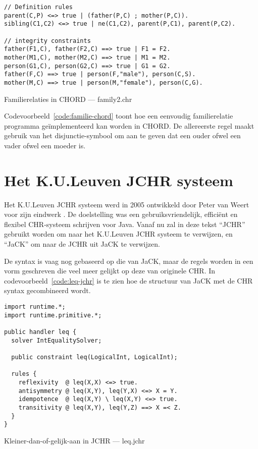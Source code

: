 \begin{exCode}[bhp]
\begin{Verbatim}[frame=single]
// Definition rules
parent(C,P) <=> true | (father(P,C) ; mother(P,C)).
sibling(C1,C2) <=> true | ne(C1,C2), parent(P,C1), parent(P,C2).

// integrity constraints
father(F1,C), father(F2,C) ==> true | F1 = F2.
mother(M1,C), mother(M2,C) ==> true | M1 = M2.
person(G1,C), person(G2,C) ==> true | G1 = G2.
father(F,C) ==> true | person(F,"male"), person(C,S).
mother(M,C) ==> true | person(M,"female"), person(C,G).
\end{Verbatim}
\caption{Familierelaties in CHORD --- family2.chr}
\label{code:familie-chord}
\end{exCode}
Codevoorbeeld~\ref{code:familie-chord} toont hoe een eenvoudig familierelatie programma ge\"implementeerd kan worden in CHORD. De allereerste regel maakt gebruik van het disjunctie-symbool \code{;} om aan te geven dat een ouder ofwel een vader ofwel een moeder is.

\section{Het K.U.Leuven JCHR systeem}

Het K.U.Leuven JCHR systeem werd in 2005 ontwikkeld door Peter van Weert voor zijn eindwerk \cite{jchr_thesis}. De doelstelling was een gebruiksvriendelijk, effici\"ent en flexibel CHR-systeem schrijven voor Java. Vanaf nu zal in deze tekst ``JCHR'' gebruikt worden om naar het K.U.Leuven JCHR systeem te verwijzen, en ``JaCK'' om naar de JCHR uit JaCK te verwijzen.

De syntax is vaag nog gebaseerd op die van JaCK, maar de regels worden in een vorm geschreven die veel meer gelijkt op deze van originele CHR. In codevoorbeeld~\ref{code:leq-jchr} is te zien hoe de structuur van JaCK met de CHR syntax gecombineerd wordt.
\begin{exCode}
\begin{Verbatim}[frame=single]
import runtime.*;
import runtime.primitive.*;

public handler leq {
  solver IntEqualitySolver;

  public constraint leq(LogicalInt, LogicalInt);

  rules {
    reflexivity  @ leq(X,X) <=> true.
    antisymmetry @ leq(X,Y), leq(Y,X) <=> X = Y.
    idempotence  @ leq(X,Y) \ leq(X,Y) <=> true.
    transitivity @ leq(X,Y), leq(Y,Z) ==> X =< Z.
  }
}

\end{Verbatim}
\caption{Kleiner-dan-of-gelijk-aan in JCHR --- leq.jchr}
\label{code:leq-jchr}
\end{exCode}
